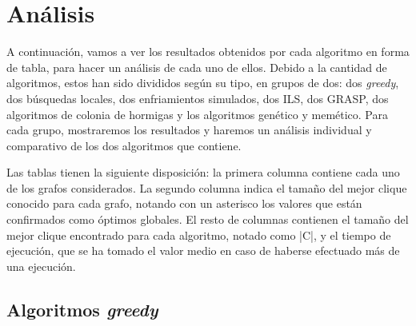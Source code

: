 \section{Análisis}

A continuación, vamos a ver los resultados obtenidos por cada algoritmo en forma de tabla,
para hacer un análisis de cada uno de ellos. Debido a la cantidad de algoritmos, estos
han sido divididos según su tipo, en grupos de dos: dos \textit{greedy}, dos búsquedas
locales, dos enfriamientos simulados, dos ILS, dos GRASP, dos algoritmos de colonia de
hormigas y los algoritmos genético y memético. Para cada grupo, mostraremos los resultados
y haremos un análisis individual y comparativo de los dos algoritmos que contiene.

Las tablas tienen la siguiente disposición: la primera columna contiene cada uno de los
grafos considerados. La segundo columna indica el tamaño del mejor clique conocido para
cada grafo, notando con un asterisco los valores que están confirmados como óptimos
globales. El resto de columnas contienen el tamaño del mejor clique encontrado para cada
algoritmo, notado como |C|, y el tiempo de ejecución, que se ha tomado el valor medio en
caso de haberse efectuado más de una ejecución.

\subsection{Algoritmos \textit{greedy}}

